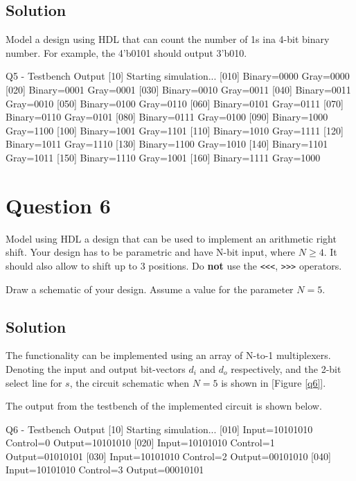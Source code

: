 \documentclass[../main.tex]{subfiles}
\begin{document}
\subsection*{Solution}

Model a design using HDL that can count the number of 1s ina  4-bit binary number. For example, the 4'b0101 should output 3'b010.

\begin{mintedterminal}{Q5 - Testbench Output}
[10] Starting simulation...
[010] Binary=0000 Gray=0000
[020] Binary=0001 Gray=0001
[030] Binary=0010 Gray=0011
[040] Binary=0011 Gray=0010
[050] Binary=0100 Gray=0110
[060] Binary=0101 Gray=0111
[070] Binary=0110 Gray=0101
[080] Binary=0111 Gray=0100
[090] Binary=1000 Gray=1100
[100] Binary=1001 Gray=1101
[110] Binary=1010 Gray=1111
[120] Binary=1011 Gray=1110
[130] Binary=1100 Gray=1010
[140] Binary=1101 Gray=1011
[150] Binary=1110 Gray=1001
[160] Binary=1111 Gray=1000
\end{mintedterminal}

\newpage

\section{Question 6}

Model using HDL a design that can be used to implement an arithmetic right shift. Your design has to be parametric and have N-bit input, where $N \geq 4$. It should also allow to shift up to 3 positions. Do \textbf{not} use the \texttt{<<<}, \texttt{>>>} operators.

Draw a schematic of your design. Assume a value for the parameter $N = 5$.

\subsection*{Solution}

The functionality can be implemented using an array of N-to-1 multiplexers. Denoting the input and output bit-vectors $d_i$ and $d_o$ respectively, and the 2-bit select line for $s$, the circuit schematic when $N = 5$ is shown in [Figure \ref{q6}].

The output from the testbench of the implemented circuit is shown below.

\begin{mintedterminal}{Q6 - Testbench Output}
[10] Starting simulation...
[010] Input=10101010 Control=0 Output=10101010
[020] Input=10101010 Control=1 Output=01010101
[030] Input=10101010 Control=2 Output=00101010
[040] Input=10101010 Control=3 Output=00010101
\end{mintedterminal}
\end{document}
